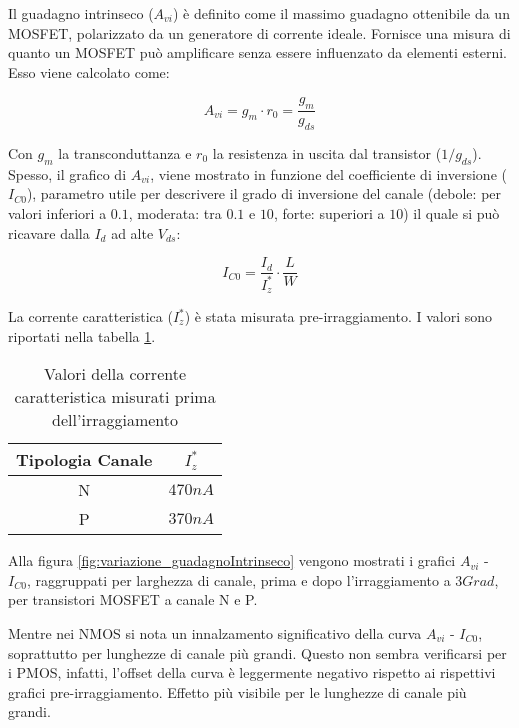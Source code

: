 Il guadagno intrinseco ($A_{vi}$) è definito come il massimo guadagno ottenibile da un MOSFET, polarizzato da un generatore di corrente ideale. Fornisce una misura di quanto un MOSFET può amplificare senza essere influenzato da elementi esterni. Esso viene calcolato come:

$$A_{vi} = g_{m} \cdot r_0 = \frac{g_{m}}{g_{ds}} $$

Con $g_m$ la transconduttanza e $r_0$ la resistenza in uscita dal transistor (${1}/{g_{ds}}$). Spesso, il grafico di $A_{vi}$, viene mostrato in funzione del coefficiente di inversione ($I_{C0}$), parametro utile per descrivere il grado di inversione del canale (debole: per valori inferiori a $0.1$, moderata: tra $0.1$ e $10$, forte: superiori a $10$) il quale si può ricavare dalla $I_d$ ad alte $V_{ds}$:

$$I_{C0} = \frac{I_{d}}{I_{z}^{*}} \cdot \frac{L}{W}$$

La corrente caratteristica ($I_{z}^{*}$) è stata misurata pre-irraggiamento. I valori sono riportati nella tabella \ref{tab:corrente_caratteristica}.

\begin{table}[ht]
    \centering
    \begin{tabular}{c c}
        \toprule
        Tipologia Canale & $I_{z}^{*}$ \\
        \midrule
        N                & $470nA$     \\
        P                & $370nA$     \\
        \bottomrule
    \end{tabular}
    \caption[Valori estratti $I_z^*$]{Valori della corrente caratteristica misurati prima dell'irraggiamento}
    \label{tab:corrente_caratteristica}
\end{table}


Alla figura \ref{fig:variazione_guadagnoIntrinseco} vengono mostrati i grafici $A_{vi}$ - $I_{C0}$, raggruppati per larghezza di canale, prima e dopo l'irraggiamento a $3Grad$, per transistori MOSFET a canale N e P.

\vspace{0.5cm}

Mentre nei NMOS si nota un innalzamento significativo della curva $A_{vi}$ - $I_{C0}$, soprattutto per lunghezze di canale più grandi. Questo non sembra verificarsi per i PMOS, infatti, l'offset della curva è leggermente negativo rispetto ai rispettivi grafici pre-irraggiamento. Effetto più visibile per le lunghezze di canale più grandi.



